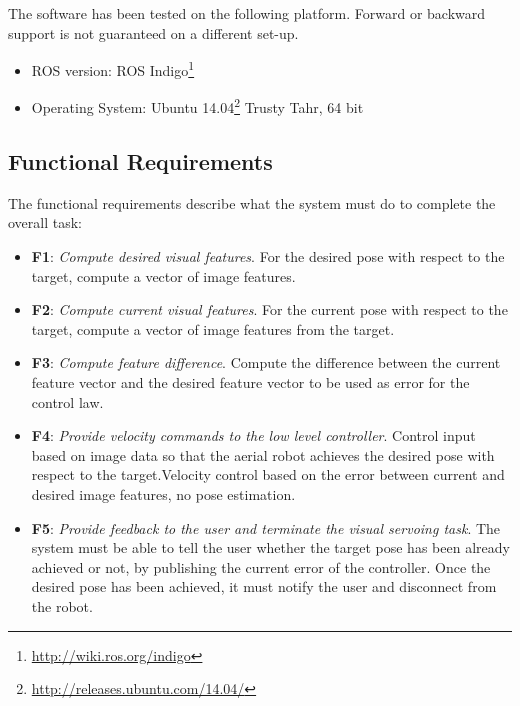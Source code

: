 The software  has been tested on the following platform. Forward or backward support is not guaranteed on a different set-up.

\begin{itemize}
	\item ROS version: ROS Indigo\footnote{\url{http://wiki.ros.org/indigo}}
	\item Operating System: Ubuntu 14.04\footnote{\url{http://releases.ubuntu.com/14.04/}} Trusty Tahr, 64 bit
\end{itemize}

\pagebreak

\subsection{Functional Requirements}
\label{sec:functional-requirements}

The functional requirements describe what the system must do to complete the overall task:

\begin{itemize}
	\item \textbf{F1}: \emph{Compute desired visual features}. For the desired pose with respect to the target, compute a vector of image features. 
	
	\item \textbf{F2}: \emph{Compute current visual features}. For the current pose with respect to the target, compute a vector of image features from the target. 
	
	\item \textbf{F3}: \emph{Compute feature difference}. Compute the difference between the current feature vector and the desired feature vector to be used as error for the control law.		
	
	\item \textbf{F4}: \emph{Provide velocity commands to the low level controller}. Control input based on image data so that the aerial robot achieves the desired pose with respect to the target.Velocity control based on the error between current and desired image features, no pose estimation.
	
	\item \textbf{F5}: \emph{Provide feedback to the user and terminate the visual servoing task}. The system must be able to tell the user whether the target pose has been already achieved or not, by publishing the current error of the controller. Once the desired pose has been achieved, it must notify the user and disconnect from the robot.
\end{itemize}

